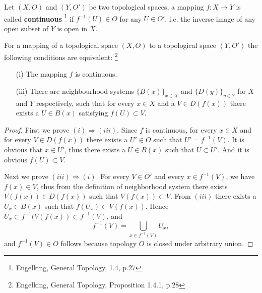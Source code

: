 \begin{definition} \label{D:cont}
Let $(X,O)$ and $(Y,O')$ be two topological spaces, a mapping $f:X\to Y$ is
called \textbf{continuous} 
\footnote{Engelking, General Topology, 1.4, p.27}
if $f^{-1}(U)\in O$ for any $U\in O'$, i.e. the
inverse image of any open subset of $Y$ is open in $X$.
\end{definition}


\begin{proposition} \label{P:cont}
For a mapping of a topological space $(X,O)$ to a topological space $(Y,O')$ the
following conditions are equivalent:
  \footnote{Engelking, General Topology, Proposition 1.4.1, p.28}
\begin{enumerate}
  \item[(i)] The mapping $f$ is continuous.
  \item[(iii)] There are neighbourhood systems $\{B(x)\}_{x\in X}$ and 
     $\{D(y)\}_{y\in Y}$ for $X$ and $Y$ respectively, such that for every
     $x\in X$ and a $V\in D(f(x))$ there exists a $U\in B(x)$ satisfying
     $f(U)\subset V$.
\end{enumerate}
\end{proposition} 

\begin{proof}
First we prove $(i)\Rightarrow (iii)$. Since $f$ is continuous, for every 
$x\in X$ and for every $V\in D(f(x))$ there exists a $U'\in O$ such that 
$U'=f^{-1}(V)$. It is obvious that $x\in U'$, thus there exists a $U\in B(x)$
such that $U\subset U'$. And it is obvious $f(U)\subset V$.

Next we prove $(iii)\Rightarrow (i)$. For every $V\in O'$ and every 
$x\in f^{-1}(V)$, we have $f(x)\in V$, thus from the definition of neighborhood
system there exists $V(f(x))\in D(f(x))$ such that $V(f(x))\subset V$. 
From $(iii)$ there exists a $U_x\in B(x)$ such that $f(U_x)\subset V(f(x))$.
Hence $U_x\subset f^{-1}(V(f(x))\subset f^{-1}(V)$, and
\[
  f^{-1}(V)=\bigcup_{x\in f^{-1}(V)} U_x,
\]
and $f^{-1}(V)\in O$ follows because topology $O$ is closed under arbitrary 
union.
\end{proof}


    
    


